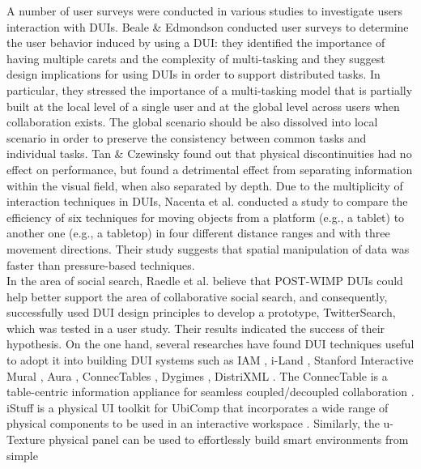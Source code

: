 A number of user surveys were conducted in various studies to investigate users
interaction with DUIs. \cite{vanderdonckt2010distributed} Beale & Edmondson
\cite{beale2007multiple} conducted user surveys to determine the user behavior
induced by using a DUI:
they identified the importance of having multiple carets and the complexity of multi-tasking and they suggest design implications for using DUIs in order to support distributed
tasks. In particular, they stressed the importance of a multi-tasking model that
is partially built at the local level of a single user and at the global level
across users when collaboration exists. The global scenario should be also
dissolved into local scenario in order to preserve the consistency between
common tasks and individual tasks. Tan & Czewinsky \cite{tan2003effects} found
out that physical discontinuities had no effect on performance, but found a detrimental effect from separating information within the visual field, when also separated by depth. Due to the multiplicity of interaction techniques in DUIs, Nacenta et al. conducted a study to compare the efficiency of six techniques for moving objects from a platform (e.g., a tablet) to another one (e.g., a tabletop) in four different distance ranges and with three movement directions. Their study suggests that spatial manipulation of data was faster than pressure-based techniques.\\
In the area of social search, Raedle et al. \cite{radle2013twistersearch}
believe that POST-WIMP DUIs could help better support the area of collaborative
social search, and consequently, successfully used DUI design principles to 
develop a prototype, TwitterSearch, which was tested in a user study. Their
results indicated the success of their hypothesis.
On the one hand, several researches have
found DUI techniques useful to adopt it into building DUI systems such as IAM
\cite{coutaz2003software}, i-Land \cite{streitz1999land}, Stanford Interactive
Mural \cite{guimbretiere2001fluid}, Aura \cite{sousa2002aura}, ConnecTables
\cite{tandler2001connectables} , Dygimes \cite{vandervelpen2004towards},
DistriXML \cite{grolaux2004migratable}. The ConnecTable is a table-centric
information appliance for seamless coupled/decoupled collaboration
\cite{tandler2001connectables}. iStuff is a physical UI toolkit for UbiComp that
incorporates a wide range of physical components to be used in an interactive
workspace \cite{ballagas2003istuff}. Similarly, the u-Texture \cite{kohtake2005u}
physical panel can be used to effortlessly build smart environments from simple
